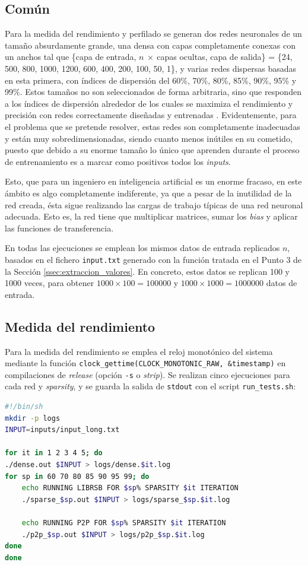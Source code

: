 \subsection{Común}
\label{ssec:comun_metodologia}
Para la medida del rendimiento y perfilado se generan dos redes neuronales de un tamaño absurdamente grande, una densa con capas completamente conexas con un anchos tal que \{capa de entrada, $n\:\times\:$capas ocultas, capa de salida\} = \{24, 500, 800, 1000, 1200, 600, 400, 200, 100, 50, 1\}, y varias redes dispersas basadas en esta primera, con índices de dispersión del 60\%, 70\%, 80\%, 85\%, 90\%, 95\% y 99\%. Estos tamaños no son seleccionados de forma arbitraria, sino que responden a los índices de dispersión alrededor de los cuales se maximiza el rendimiento y precisión con redes correctamente diseñadas y entrenadas \cite[Figura 4]{hoefler2102sparsity}. Evidentemente, para el problema que se pretende resolver, estas redes son completamente inadecuadas y están muy sobredimensionadas, siendo cuanto menos inútiles en su cometido, puesto que debido a su enorme tamaño lo único que aprenden durante el proceso de entrenamiento es a marcar como positivos todos los \textit{inputs}.

Esto, que para un ingeniero en inteligencia artificial es un enorme fracaso, en este ámbito es algo completamente indiferente, ya que a pesar de la inutilidad de la red creada, ésta sigue realizando las cargas de trabajo típicas de una red neuronal adecuada. Esto es, la red tiene que multiplicar matrices, sumar los \textit{bias} y aplicar las funciones de transferencia.

En todas las ejecuciones se emplean los mismos datos de entrada replicados $n$, basados en el fichero \texttt{input.txt} generado con la función tratada en el Punto 3 de la Sección \ref{ssec:extraccion_valores}. En concreto, estos datos se replican 100 y 1000 veces, para obtener $1000 \times 100 = 100000$ y $1000 \times 1000 = 1000000$ datos de entrada.

\subsection{Medida del rendimiento}
\label{ssec:medida_rendimiento_metodologia}
Para la medida del rendimiento se emplea el reloj monotónico del sistema mediante la función \texttt{clock\_gettime(CLOCK\_MONOTONIC\_RAW, \&timestamp)} en compilaciones de \textit{release} (opción \texttt{-s} o \textit{strip}). Se realizan cinco ejecuciones para cada red y \textit{sparsity}, y se guarda la salida de \texttt{stdout} con el script \texttt{run\_tests.sh}:\medskip
\begin{lstlisting}[language=bash]
#!/bin/sh
mkdir -p logs
INPUT=inputs/input_long.txt

for it in 1 2 3 4 5; do
./dense.out $INPUT > logs/dense.$it.log
for sp in 60 70 80 85 90 95 99; do
    echo RUNNING LIBRSB FOR $sp% SPARSITY $it ITERATION
    ./sparse_$sp.out $INPUT > logs/sparse_$sp.$it.log

    echo RUNNING P2P FOR $sp% SPARSITY $it ITERATION
    ./p2p_$sp.out $INPUT > logs/p2p_$sp.$it.log
done
done  
\end{lstlisting}

